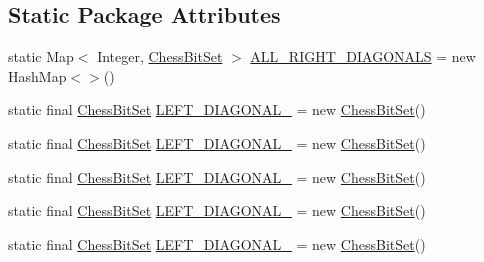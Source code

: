 \subsection*{Static Package Attributes}
\begin{DoxyCompactItemize}
\item 
static Map$<$ Integer, \mbox{\hyperlink{classcom_1_1chess_1_1engine_1_1bitboards_1_1_chess_bit_set}{Chess\+Bit\+Set}} $>$ \mbox{\hyperlink{classcom_1_1chess_1_1engine_1_1bitboards_1_1_bit_board_a0f6716984bf7cb50cc008d6e517eaeb7}{A\+L\+L\+\_\+\+R\+I\+G\+H\+T\+\_\+\+D\+I\+A\+G\+O\+N\+A\+LS}} = new Hash\+Map$<$$>$()
\item 
static final \mbox{\hyperlink{classcom_1_1chess_1_1engine_1_1bitboards_1_1_chess_bit_set}{Chess\+Bit\+Set}} \mbox{\hyperlink{classcom_1_1chess_1_1engine_1_1bitboards_1_1_bit_board_a95546639f4b3b9086e62bbd13433f3b7}{L\+E\+F\+T\+\_\+\+D\+I\+A\+G\+O\+N\+A\+L\+\_}} = new \mbox{\hyperlink{classcom_1_1chess_1_1engine_1_1bitboards_1_1_chess_bit_set}{Chess\+Bit\+Set}}()
\item 
static final \mbox{\hyperlink{classcom_1_1chess_1_1engine_1_1bitboards_1_1_chess_bit_set}{Chess\+Bit\+Set}} \mbox{\hyperlink{classcom_1_1chess_1_1engine_1_1bitboards_1_1_bit_board_ad7a2bd4c87af28df3e51158b32bd8636}{L\+E\+F\+T\+\_\+\+D\+I\+A\+G\+O\+N\+A\+L\+\_}} = new \mbox{\hyperlink{classcom_1_1chess_1_1engine_1_1bitboards_1_1_chess_bit_set}{Chess\+Bit\+Set}}()
\item 
static final \mbox{\hyperlink{classcom_1_1chess_1_1engine_1_1bitboards_1_1_chess_bit_set}{Chess\+Bit\+Set}} \mbox{\hyperlink{classcom_1_1chess_1_1engine_1_1bitboards_1_1_bit_board_a5bfc2adb2f82f22b0c41603e04e38941}{L\+E\+F\+T\+\_\+\+D\+I\+A\+G\+O\+N\+A\+L\+\_}} = new \mbox{\hyperlink{classcom_1_1chess_1_1engine_1_1bitboards_1_1_chess_bit_set}{Chess\+Bit\+Set}}()
\item 
static final \mbox{\hyperlink{classcom_1_1chess_1_1engine_1_1bitboards_1_1_chess_bit_set}{Chess\+Bit\+Set}} \mbox{\hyperlink{classcom_1_1chess_1_1engine_1_1bitboards_1_1_bit_board_aacdb9366c6820d32743fbd4049dc2162}{L\+E\+F\+T\+\_\+\+D\+I\+A\+G\+O\+N\+A\+L\+\_}} = new \mbox{\hyperlink{classcom_1_1chess_1_1engine_1_1bitboards_1_1_chess_bit_set}{Chess\+Bit\+Set}}()
\item 
static final \mbox{\hyperlink{classcom_1_1chess_1_1engine_1_1bitboards_1_1_chess_bit_set}{Chess\+Bit\+Set}} \mbox{\hyperlink{classcom_1_1chess_1_1engine_1_1bitboards_1_1_bit_board_a95813d02585c8a6b4c70223bd0598788}{L\+E\+F\+T\+\_\+\+D\+I\+A\+G\+O\+N\+A\+L\+\_}} = new \mbox{\hyperlink{classcom_1_1chess_1_1engine_1_1bitboards_1_1_chess_bit_set}{Chess\+Bit\+Set}}()
$$
\end{DoxyCompactItemize}
